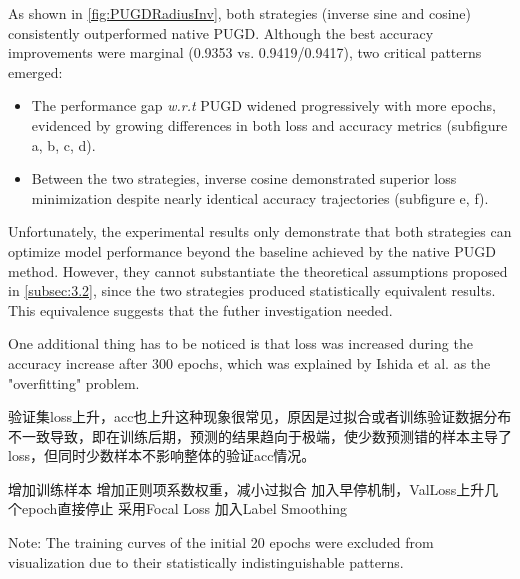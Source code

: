 \documentclass[10pt,twocolumn,letterpaper]{article}
\begin{document}
As shown in \cref{fig:PUGDRadiusInv}, both strategies (inverse sine and cosine) consistently outperformed native PUGD. Although the best accuracy improvements were marginal (0.9353 vs. 0.9419/0.9417), two critical patterns emerged:  
\begin{itemize}
    \item The performance gap \textit{w.r.t} PUGD widened progressively with more epochs, evidenced by growing differences in both loss and accuracy metrics  (subfigure a, b, c, d).
    \item Between the two strategies, inverse cosine demonstrated superior loss minimization despite nearly identical accuracy trajectories (subfigure e, f).
\end{itemize}
Unfortunately, the experimental results only demonstrate that both strategies can optimize model performance beyond the baseline achieved by the native PUGD method. However, they cannot substantiate the theoretical assumptions proposed in \cref{subsec:3.2}, since the two strategies produced statistically equivalent results. This equivalence suggests that the futher investigation needed.


One additional thing has to be noticed is that loss was increased during the accuracy increase after 300 epochs, which was explained by Ishida et al. \cite{ishida2021needzerotrainingloss} as the "overfitting" problem.

验证集loss上升，acc也上升这种现象很常见，原因是过拟合或者训练验证数据分布不一致导致，即在训练后期，预测的结果趋向于极端，使少数预测错的样本主导了loss，但同时少数样本不影响整体的验证acc情况。

增加训练样本
增加正则项系数权重，减小过拟合
加入早停机制，ValLoss上升几个epoch直接停止
采用Focal Loss
加入Label Smoothing


Note: The training curves of the initial 20 epochs were excluded from visualization due to their statistically indistinguishable patterns.
\end{document}
